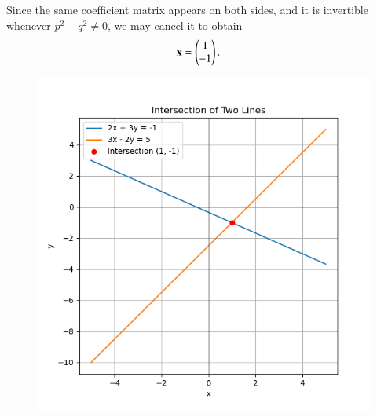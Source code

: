 \documentclass[journal]{IEEEtran}
\begin{document}
\noindent
Since the same coefficient matrix appears on both sides, and it is invertible 
whenever $p^2+q^2 \neq 0$, we may cancel it to obtain
\begin{align}
\mathbf{x} &= \begin{pmatrix}1\\ -1\end{pmatrix}.
\end{align}

\begin{figure}[H]
   \centering
   \includegraphics[width=0.7\columnwidth]{figs/fig1.png}
   \caption{}
   \label{Figure}
\end{figure}
    
\end{document}
